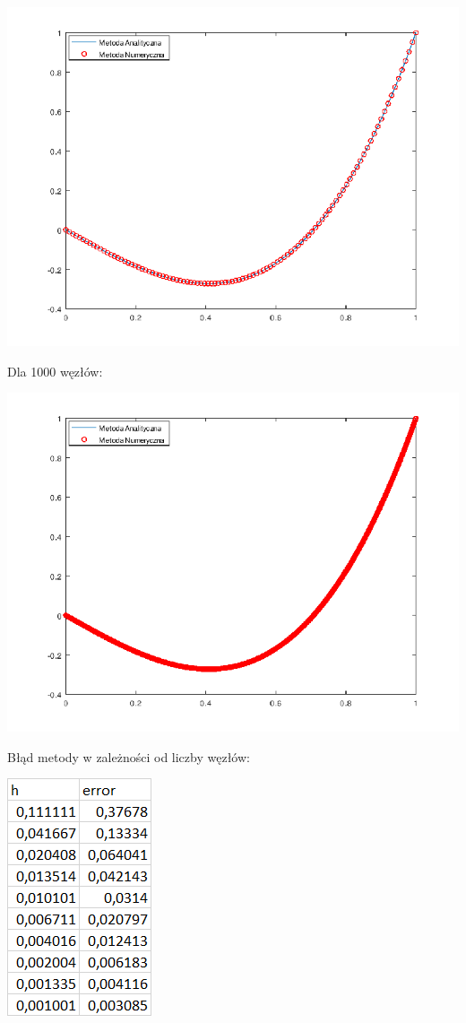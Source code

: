 {\centering

\includegraphics{Lab3/charts/zad2/lab_3_2_n_100.png}

}

Dla 1000 węzłów:

{\centering

\includegraphics{Lab3/charts/zad2/lab_3_2_n_1000.png}

}

\newpage

Błąd metody w zależności od liczby węzłów:

\includegraphics{Lab3/charts/zad2/error_dane.png}

